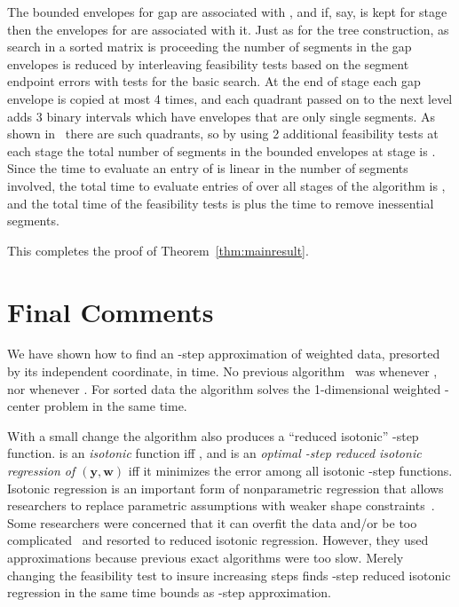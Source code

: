 \documentclass[11pt]{article}
\renewcommand{\vec}[1]{\ensuremath{\mathbf{#1}}}
\newcommand{\data}{\ensuremath{(\vec{y},\vec{w})}}
\begin{document}
The bounded envelopes for gap  are associated with , and if, say,  is kept for stage  then the envelopes for  are associated with it.
Just as for the tree construction, as search in a sorted matrix is proceeding the number of segments in the gap envelopes is reduced by interleaving feasibility tests based on the segment endpoint errors with tests for the basic search.
At the end of stage  each gap envelope is copied at most 4 times, and each quadrant passed on to the next level adds  3 binary intervals which have envelopes that are only single segments.
As shown in~\cite{FredericksonJohnsonSortedMatrix} there are  such quadrants, so by using 2 additional feasibility tests at each stage the total number of segments in the bounded envelopes at stage  is .
Since the time to evaluate an entry of  is linear in the number of segments involved, the total time to evaluate entries of  over all stages of the algorithm is , and the total time of the  feasibility tests is  plus the  time to remove inessential segments.

This completes the proof of Theorem~\ref{thm:mainresult}.



\section{Final Comments}\label{sec:Final}

We have shown how to find an  -step approximation of weighted data, presorted by its independent coordinate,
in  time.
No previous algorithm~
\cite{ChenWangPiecewise2013,ChenWangnlogn2013,DiazBanezLinearDecide,FournierVigneronLinftyStep,FournierVigneronLinftyParametric,FulopPrillLinftyStep,GuhaShimLinftyHistogram,JQReducedIso_IF2012,KarrasetalHistogramDuality,LiuRandomizedLinftyReduced,MaysterLopezStep} 
was  whenever , nor  whenever .
For sorted data the algorithm solves the 1-dimensional weighted -center problem in the same time.

With a small change the algorithm also produces a ``reduced isotonic'' -step function.
 is an \textit{isotonic} function iff , and is
an \textit{optimal  -step reduced isotonic regression of \data} iff it minimizes the  error among all isotonic -step functions.
Isotonic regression is an important form of nonparametric regression that allows researchers to replace parametric assumptions with weaker shape constraints~\cite{BarlowetalBook,RobertsonWrightDykstra}.
Some researchers were concerned that it can overfit the data and/or be too complicated~\cite{HaiminenetalReducedUnimodal,SalantiUlmReduced,SchellSingh} and resorted to reduced isotonic regression.
However, they used approximations because previous exact algorithms were too slow.
Merely changing the feasibility test to insure increasing steps finds -step reduced isotonic regression in the same time bounds as -step approximation.
\end{document}
